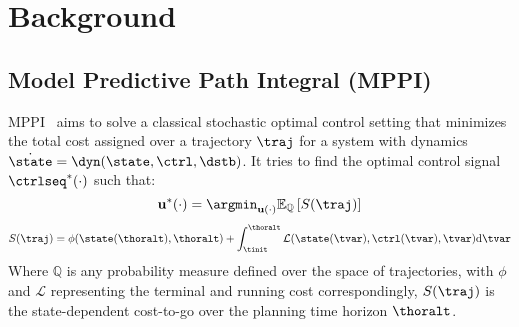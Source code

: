 \section{Background}

\subsection{Model Predictive Path Integral (MPPI)}

MPPI~\cite{mppi,mppi_tro} aims to solve a classical stochastic optimal control setting that minimizes the total cost assigned over a trajectory $\traj$ for a system with dynamics $\dot{\state} = \dyn(\state, \ctrl, \dstb)$. It tries to find the optimal control signal $\ctrlseq^*(\cdot)$ such that:
%
\begin{equation}
    \mathbf{u}^{*}(\cdot)=\argmin_{\mathbf{u}(\cdot)}\mathbb{E}_{\mathbb{Q}}\left[S(\traj)\right]
\end{equation}
%
%
\begin{equation}    S(\traj)=\phi(\state(\thoralt),\thoralt)+\int_{\tinit}^{\thoralt}{\mathcal{L}}(\state(\tvar),\ctrl(\tvar),\tvar)\mathrm{d}\tvar
\end{equation}
%
Where $\mathbb{Q}$ is any probability measure defined over the space of trajectories, with $\phi$ and $\mathcal{L}$ representing the terminal and running cost correspondingly, $S(\traj)$ is the state-dependent cost-to-go over the planning time horizon $\thoralt$.

